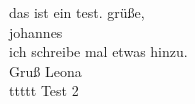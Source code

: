 \documentclass{article}
\begin{document}
das ist ein test. gr\"u{\ss}e,\\

johannes\\

ich schreibe mal etwas hinzu.\\

Gruß Leona\\

ttttt
Test 2
\end{document}
